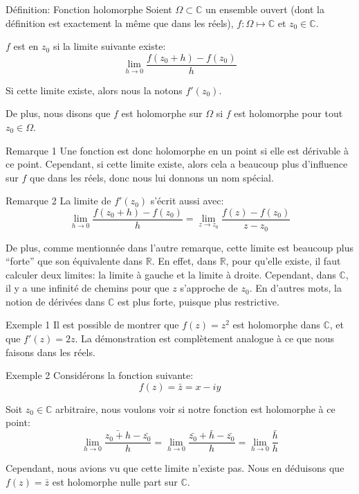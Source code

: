 \documentclass[a4paper]{article}
\begin{document}
\begin{parag}{Définition: Fonction holomorphe}
    Soient $\Omega \subset \mathbb{C}$ un ensemble ouvert (dont la définition est exactement la même que dans les réels), $f: \Omega \mapsto \mathbb{C}$ et $z_0 \in \mathbb{C}$.

    $f$ est  en $z_0$ si la limite suivante existe: 
    \[\lim_{h \to 0} \frac{f\left(z_0 + h\right) - f\left(z_0\right)}{h}\]

    Si cette limite existe, alors nous la notons $f'\left(z_0\right)$.

    De plus, nous disons que $f$ est holomorphe sur $\Omega$ si $f$ est holomorphe pour tout $z_0 \in \Omega$.
    
    \begin{subparag}{Remarque 1}
        Une fonction est donc holomorphe en un point si elle est dérivable à ce point. Cependant, si cette limite existe, alors cela a beaucoup plus d'influence sur $f$ que dans les réels, donc nous lui donnons un nom spécial.
    \end{subparag}
    
    \begin{subparag}{Remarque 2}
        La limite de $f'\left(z_0\right)$ s'écrit aussi avec: 
        \[\lim_{h \to 0} \frac{f\left(z_0 + h\right) - f\left(z_0\right)}{h} = \lim_{z \to z_0} \frac{f\left(z\right) - f\left(z_0\right)}{z - z_0}\]

        De plus, comme mentionnée dans l'autre remarque, cette limite est beaucoup plus ``forte'' que son équivalente dans $\mathbb{R}$. En effet, dans $\mathbb{R}$, pour qu'elle existe, il faut calculer deux limites: la limite à gauche et la limite à droite. Cependant, dans $\mathbb{C}$, il y a une infinité de chemins pour que $z$ s'approche de $z_0$. En d'autres mots, la notion de dérivées dans $\mathbb{C}$ est plus forte, puisque plus restrictive.
    \end{subparag}
\end{parag}

\begin{parag}{Exemple 1}
   Il est possible de montrer que $f\left(z\right) = z^2$ est holomorphe dans $\mathbb{C}$, et que $f'\left(z\right) = 2z$. La démonstration est complètement analogue à ce que nous faisons dans les réels.
\end{parag}

\begin{parag}{Exemple 2}
    Considérons la fonction suivante: 
    \[f\left(z\right) = \bar{z} = x - iy\]
    
    Soit $z_0 \in \mathbb{C}$ arbitraire, nous voulons voir si notre fonction est holomorphe à ce point: 
    \[\lim_{h \to 0} \frac{\bar{z_0 + h} - \bar{z_0}}{h} = \lim_{h \to 0} \frac{\bar{z_0} + \bar{h} - \bar{z_0}}{h} = \lim_{h \to 0} \frac{\bar{h}}{h}\]

    Cependant, nous avions vu que cette limite n'existe pas. Nous en déduisons que $f\left(z\right) = \bar{z}$ est holomorphe nulle part sur $\mathbb{C}$.
\end{parag}
\end{document}
